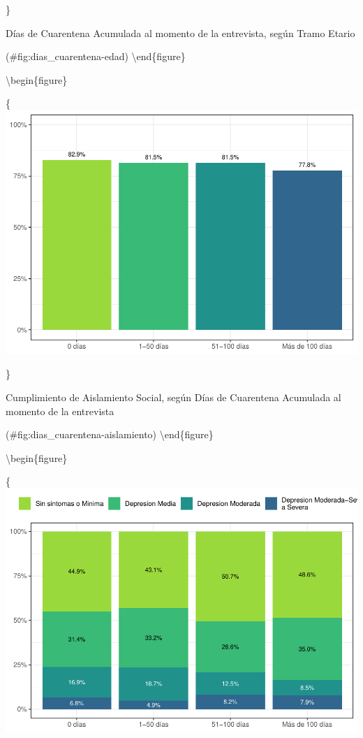 \documentclass[
  12pt,
]{book}
\begin{document}
\}

\caption{Días de Cuarentena Acumulada al momento de la entrevista, según Tramo Etario}

(\#fig:dias\_cuarentena-edad)
\textbackslash end\{figure\}

\textbackslash begin\{figure\}

\{\centering \includegraphics{reporte-elsoc_files/figure-latex/dias_cuarentena-aislamiento-1}

\}

\caption{Cumplimiento de Aislamiento Social, según Días de Cuarentena Acumulada al momento de la entrevista}

(\#fig:dias\_cuarentena-aislamiento)
\textbackslash end\{figure\}

\textbackslash begin\{figure\}

\{\centering \includegraphics{reporte-elsoc_files/figure-latex/dias_cuarentena-depr-1}
\end{document}
